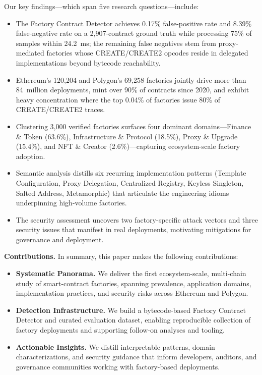 \documentclass[acmsmall, screen]{acmart}
\begin{document}
	Our key findings—which span five research questions—include:
	\begin{itemize}[leftmargin=0.4cm,topsep=0.1cm]
		\item The Factory Contract Detector achieves 0.17\% false-positive rate and 8.39\% false-negative
		rate on a 2,907-contract ground truth while processing 75\% of samples within 24.2~ms; the
		remaining false negatives stem from proxy-mediated factories whose CREATE/CREATE2 opcodes
		reside in delegated implementations beyond bytecode reachability.

		\item Ethereum's 120{,}204 and Polygon's 69{,}258 factories jointly drive more than 84~million
		deployments, mint over 90\% of contracts since 2020, and exhibit heavy concentration
		where the top 0.04\% of factories issue 80\% of CREATE/CREATE2 traces.

		\item Clustering 3,000 verified factories surfaces four dominant domains—Finance \& Token (63.6\%),
		Infrastructure \& Protocol (18.5\%), Proxy \& Upgrade (15.4\%), and NFT \& Creator (2.6\%)—capturing
		ecosystem-scale factory adoption.

		\item Semantic analysis distills six recurring implementation patterns (Template
		Configuration, Proxy Delegation, Centralized Registry, Keyless Singleton, Salted Address,
		Metamorphic) that articulate the engineering idioms underpinning high-volume factories.

		\item The security assessment uncovers two factory-specific attack vectors and three security
		issues that manifest in real deployments, motivating mitigations for governance and
		deployment.
	\end{itemize}
	\textbf{Contributions.} In summary, this paper makes the following contributions:
	\begin{itemize}[leftmargin=0.4cm,topsep=0.1cm]
		\item \textbf{Systematic Panorama.} We deliver the first ecosystem-scale, multi-chain study of
		smart-contract factories, spanning prevalence, application domains, implementation
		practices, and security risks across Ethereum and Polygon.

		\item \textbf{Detection Infrastructure.} We build a bytecode-based Factory Contract Detector
		and curated evaluation dataset, enabling reproducible collection of factory deployments and
		supporting follow-on analyses and tooling.

		\item \textbf{Actionable Insights.} We distill interpretable patterns, domain characterizations,
		and security guidance that inform developers, auditors, and governance communities
		working with factory-based deployments.
	\end{itemize}
\end{document}
